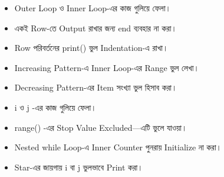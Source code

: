 

\begin{rememberbox}

\begin{itemize}

\item Outer Loop ও Inner Loop-এর কাজ গুলিয়ে ফেলা।

\item একই Row-তে Output রাখার জন্য
\textenglish{\ttfamily end}
ব্যবহার না করা।

\item Row পরিবর্তনের
\textenglish{\ttfamily print()}
ভুল Indentation-এ রাখা।

\item Increasing Pattern-এ Inner Loop-এর Range ভুল লেখা।

\item Decreasing Pattern-এর Item সংখ্যা ভুল হিসাব করা।

\item
\textenglish{\ttfamily i}
ও
\textenglish{\ttfamily j}
-এর কাজ গুলিয়ে ফেলা।

\item
\textenglish{\ttfamily range()}
-এর Stop Value Excluded—এটি ভুলে যাওয়া।

\item Nested
\textenglish{\ttfamily while}
Loop-এ Inner Counter পুনরায় Initialize না করা।

\item Star-এর জায়গায়
\textenglish{\ttfamily i}
বা
\textenglish{\ttfamily j}
ভুলভাবে Print করা।

\end{itemize}

\end{rememberbox}


